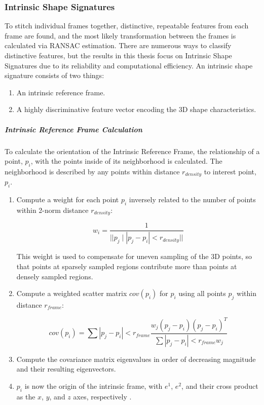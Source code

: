 \documentclass[12pt]{drexelthesis}
\let\Oldsubsubsection\subsubsection
\renewcommand{\subsubsection}{\FloatBarrier\Oldsubsubsection}
\begin{document}
\subsubsection{Intrinsic Shape Signatures}
To stitch individual frames together, distinctive, repeatable features from each frame are found, and the most likely transformation between the frames is calculated via RANSAC estimation. There are numerous ways to classify distinctive features, but the results in this thesis focus on Intrinsic Shape Signatures due to its reliability and computational efficiency.
An intrinsic shape signature consists of two things:

\begin{enumerate}
	\item An intrinsic reference frame.
	\item A highly discriminative feature vector encoding the 3D shape characteristics.
\end{enumerate}

\subparagraph{Intrinsic Reference Frame Calculation}
To calculate the orientation of the Intrinsic Reference Frame, the relationship of a point, $p_{i}$, with the points inside of its neighborhood is calculated. The neighborhood is described by any points within distance $r_{density}$ to interest point, $p_{i}$.

\begin{enumerate}
	\item Compute a weight for each point $p_{i}$ inversely related to the number of points within 2-norm distance $r_{density}$:
	
		\begin{equation}
		w_{i}=  \frac{1}{||p_{j} \mid |p_{j}-p_{i}| < r_{density}||}
		\end{equation}

		This weight is used to compensate for uneven sampling of the 3D points, so that points at sparsely sampled regions contribute more than points at densely sampled regions. 

	\item Compute a weighted scatter matrix $cov(p_{i})$ for $p_{i}$ using all points $p_{j}$ within distance $r_{frame}$:
	
		\begin{equation}
		cov(p_{i})= \sum{|p_{j}-p_{i}| < r_{frame}}\frac{w_{j}(p_{j}-p_{i})(p_{j}-p_{i})^{T}}{ \sum{|p_{j}-p_{i}| < r_{frame}}w_{j}}
		\end{equation}
		
	\item Compute the covariance matrix eigenvalues in order of decreasing magnitude and their resulting eigenvectors.
	\item $p_{i}$ is now the origin of the intrinsic frame, with $e^{1}$, $e^{2}$, and their cross product as the $x$, $y$, and $z$ axes, respectively \cite{RN60}.
\end{enumerate}
\end{document}
